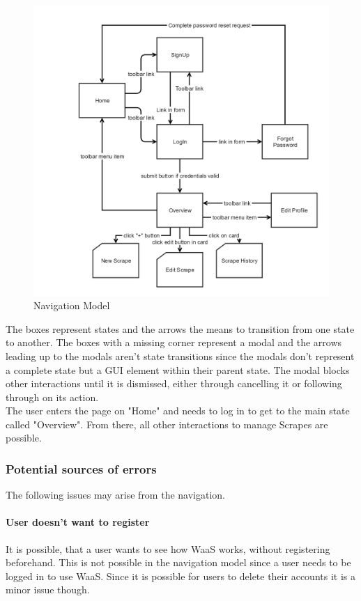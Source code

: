 \documentclass[titlepage, 12pt]{article}
\begin{document}
\begin{figure}[H]
  \includegraphics[width=0.95\linewidth]{navigationmodel_waas.png}
  \caption{Navigation Model}
  \label{fig:navigationModel}
\end{figure}

The boxes represent states and the arrows the means to transition from one state to another. The boxes with a missing corner represent a modal and the arrows leading up to the modals aren't state transitions since the modals don't
represent a complete state but a GUI element within their parent state. The modal blocks other interactions until it is dismissed, either through cancelling it or following through on its action. \\
The user enters the page on "Home" and needs to log in to get to the main state called "Overview". From there, all other interactions to manage Scrapes are possible.

\subsubsection{Potential sources of errors}
The following issues may arise from the navigation.

\paragraph{User doesn't want to register}
It is possible, that a user wants to see how WaaS works, without registering beforehand.
This is not possible in the navigation model since a user needs to be logged in to use WaaS. Since it is possible for users to delete their accounts it is a minor issue though.
\end{document}
